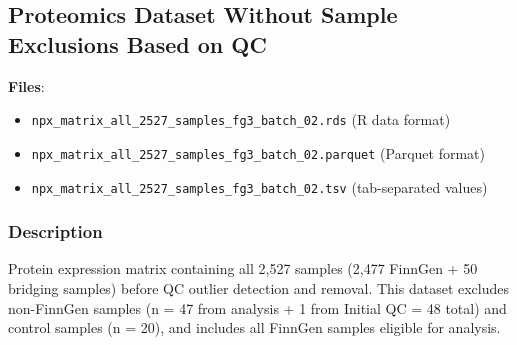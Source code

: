 \documentclass[11pt,a4paper]{article}
\begin{document}
\subsection{Proteomics Dataset Without Sample Exclusions Based on QC}

\textbf{Files}:
\begin{itemize}
\item \texttt{npx\_matrix\_all\_2527\_samples\_fg3\_batch\_02.rds} (R data format)
\item \texttt{npx\_matrix\_all\_2527\_samples\_fg3\_batch\_02.parquet} (Parquet format)
\item \texttt{npx\_matrix\_all\_2527\_samples\_fg3\_batch\_02.tsv} (tab-separated values)
\end{itemize}

\subsubsection{Description}
Protein expression matrix containing all 2,527 samples (2,477 FinnGen + 50 bridging samples) before QC outlier detection and removal. This dataset excludes non-FinnGen samples (n = 47 from analysis + 1 from Initial QC = 48 total) and control samples (n = 20), and includes all FinnGen samples eligible for analysis.
\end{document}
